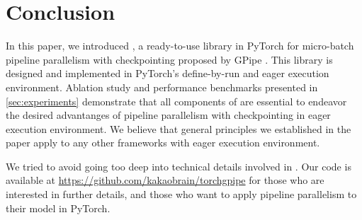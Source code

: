 
\section{Conclusion}
\label{sec:conclusion}

In this paper, we introduced {\torchgpipe}, a ready-to-use library in PyTorch for micro-batch pipeline parallelism with checkpointing proposed by GPipe \cite{huang2019gpipe}. This library is designed and implemented in PyTorch's define-by-run and eager execution environment. Ablation study and performance benchmarks presented in \autoref{sec:experiments} demonstrate that all components of {\torchgpipe} are essential to endeavor the desired advantanges of pipeline parallelism with checkpointing in eager execution environment. We believe that general principles we established in the paper apply to any other frameworks with eager execution environment.

We tried to avoid going too deep into technical details involved in {\torchgpipe}. Our code is available at \url{https://github.com/kakaobrain/torchgpipe} for those who are interested in further details, and those who want to apply pipeline parallelism to their model in PyTorch.




